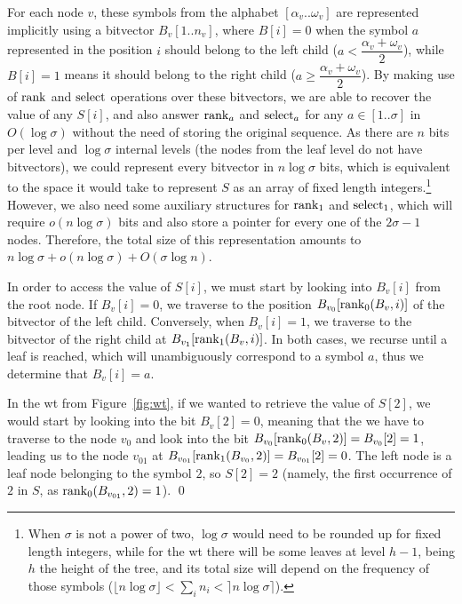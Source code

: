 \documentclass[a4paper,10pt,twoside]{book}
\begin{document}
    For each node $v$, these symbols from the alphabet $[\alpha_v..\omega_v]$ are represented implicitly using a bitvector $B_v[1..n_v]$, where $B[i] = 0$ when the symbol $a$ represented in the position $i$ should belong to the left child ($a < \dfrac{\alpha_v + \omega_v}{2}$), while $B[i] = 1$ means it should belong to the right child ($a \geq \dfrac{\alpha_v + \omega_v}{2}$). By making use of $\operatorname{rank}$ and $\operatorname{select}$ operations over these bitvectors, we are able to recover the value of any $S[i]$, and also answer $\operatorname{rank}_a$ and $\operatorname{select}_a$ for any $a \in [1..\sigma]$ in $O(\log\sigma)$ without the need of storing the original sequence. As there are $n$ bits per level and $\log\sigma$ internal levels (the nodes from the leaf level do not have bitvectors), we could represent every bitvector in $n\log\sigma$ bits, which is equivalent to the space it would take to represent $S$ as an array of fixed length integers.\footnote{When $\sigma$ is not a power of two, $\log\sigma$ would need to be rounded up for fixed length integers, while for the \gls{wt} there will be some leaves at level $h-1$, being $h$ the height of the tree, and its total size will depend on the frequency of those symbols ($\lfloor n\log\sigma\rfloor < \sum_i n_i < \rceil n\log\sigma\rceil$).} However, we also need some auxiliary structures for $\operatorname{rank}_1$ and $\operatorname{select}_1$, which will require $o(n\log\sigma)$ bits and also store a pointer for every one of the $2\sigma-1$ nodes. Therefore, the total size of this representation amounts to $n\log\sigma + o(n\log\sigma) + O(\sigma\log n)$.
    
    In order to access the value of $S[i]$, we must start by looking into $B_v[i]$ from the root node. If $B_v[i]=0$, we traverse to the position $B_{v_0}[\operatorname{rank}_0(B_v,i)]$ of the bitvector of the left child. Conversely, when $B_v[i]=1$, we traverse to the bitvector of the right child at $B_{v_1}[\operatorname{rank}_1(B_v,i)]$. In both cases, we recurse until a leaf is reached, which will unambiguously correspond to a symbol $a$, thus we determine that $B_v[i]=a$.
    
    \begin{example} \label{exp:wtaccess}
    In the \gls{wt} from Figure~\ref{fig:wt}, if we wanted to retrieve the value of $S[2]$, we would start by looking into the bit $B_v[2]=0$, meaning that the we have to traverse to the node $v_0$ and look into the bit $B_{v_0}[\operatorname{rank}_0(B_v,2)] = B_{v_0}[2] = 1$, leading us to the node $v_{01}$ at $B_{v_{01}}[\operatorname{rank}_1(B_{v_0},2)] = B_{v_{01}}[2] = 0$. The left node is a leaf node belonging to the symbol $2$, so $S[2]=2$ (namely, the first occurrence of $2$ in $S$, as $\operatorname{rank}_0(B_{v_{01}}, 2) = 1$).
    \qed
    \end{example}
    
\end{document}
